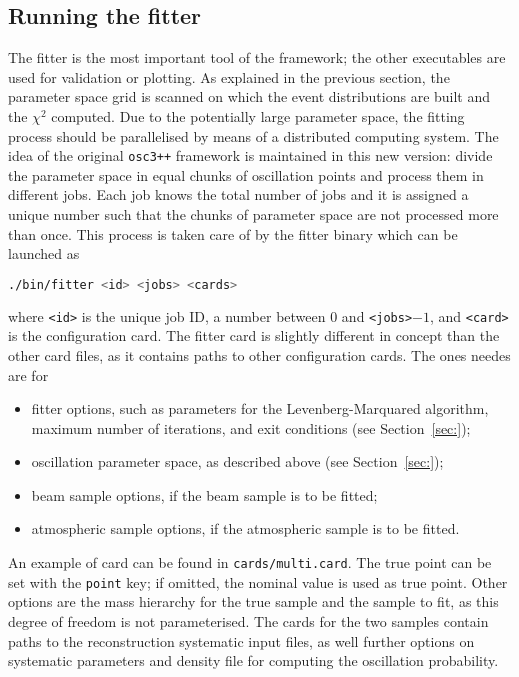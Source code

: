 \documentclass[a4paper, 11pt]{article}
\newcommand{\refsec}[1]{Section~\ref{#1}}
\begin{document}
\subsection{Running the fitter}

The fitter is the most important tool of the framework; %
the other executables are used for validation or plotting.
As explained in the previous section, the parameter space grid is scanned on which the event %
distributions are built and the $\chi^2$ computed.
Due to the potentially large parameter space, the fitting process should be parallelised %
by means of a distributed computing system.
The idea of the original \texttt{osc3++} framework is maintained in this new version: %
divide the parameter space in equal chunks of oscillation points and process them in %
different jobs.
Each job knows the total number of jobs and it is assigned a unique number such that %
the chunks of parameter space are not processed more than once.
This process is taken care of by the fitter binary which can be launched as
\begin{lstlisting}[language=bash]
	./bin/fitter <id> <jobs> <cards>
\end{lstlisting}
where \texttt{<id>} is the unique job ID, a number between 0 and \texttt{<jobs>}$-1$, and %
\texttt{<card>} is the configuration card.
The fitter card is slightly different in concept than the other card files, as it contains %
paths to other configuration cards.
The ones needes are for
\begin{itemize}
	\item fitter options, such as parameters for the Levenberg-Marquared algorithm, %
		maximum number of iterations, and exit conditions (see \refsec{sec:});
	\item oscillation parameter space, as described above (see \refsec{sec:});
	\item beam sample options, if the beam sample is to be fitted;
	\item atmospheric sample options, if the atmospheric sample is to be fitted.
\end{itemize}
An example of card can be found in \texttt{cards/multi.card}.
The true point can be set with the \texttt{point} key; if omitted, the nominal value is used %
as true point.
Other options are the mass hierarchy for the true sample and the sample to fit, %
as this degree of freedom is not parameterised.
The cards for the two samples contain paths to the reconstruction systematic input files, %
as well further options on systematic parameters and density file for computing the %
oscillation probability.
\end{document}

